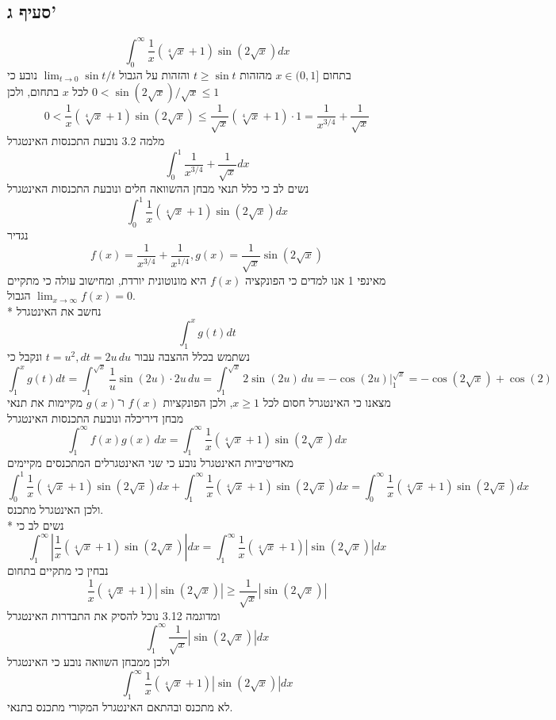 \subsection{סעיף ג'}
\[
	\int_0^\infty \frac{1}{x} (\sqrt[4]{x} + 1) \sin \left( 2 \sqrt{x} \right) dx
\]
בתחום $x \in (0, 1]$ מהזהות $t \ge \sin t$ והזהות על הגבול $\lim_{t \to 0} \sin t / t$ נובע כי $0 < \sin(2 \sqrt{x}) / \sqrt{x} \le 1$ לכל $x$ בתחום, %
ולכן
\[
	0 < 
	\frac{1}{x} (\sqrt[4]{x} + 1) \sin \left( 2 \sqrt{x} \right)
	\le \frac{1}{\sqrt{x}} (\sqrt[4]{x} + 1) \cdot 1
	= \frac{1}{x^{3/4}} + \frac{1}{\sqrt{x}}
\]
מלמה 3.2 נובעת התכנסות האינטגרל
\[
	\int_{0}^{1} \frac{1}{x^{3/4}} + \frac{1}{\sqrt{x}} dx
\]
נשים לב כי כלל תנאי מבחן ההשוואה חלים ונובעת התכנסות האינטגרל
\[
	\int_0^1 \frac{1}{x} (\sqrt[4]{x} + 1) \sin \left( 2 \sqrt{x} \right) dx
\]
נגדיר
\[
	f(x) = \frac{1}{x^{3/4}} + \frac{1}{x^{1/4}}, g(x) = \frac{1}{\sqrt{x}} \sin(2 \sqrt{x})
\]
מאינפי 1 אנו למדים כי הפונקציה $f(x)$ היא מונוטונית יורדת, ומחישוב עולה כי מתקיים הגבול $\lim_{x \to \infty} f(x) = 0$. \\*
נחשב את האינטגרל
\[
	\int_{1}^{x} g(t) dt
\]
נשתמש בכלל ההצבה עבור $t = u^2, dt = 2u \, du$ ונקבל כי
\[
	\int_{1}^{x} g(t) dt
	= \int_{1}^{\sqrt{x}} \frac{1}{u} \sin(2u) \cdot 2u \, du
	= \int_{1}^{\sqrt{x}} 2 \sin(2u) \, du
	= \left. -\cos(2u) \right|_1^{\sqrt{x}}
	= -\cos(2 \sqrt{x}) + \cos(2)
\]
מצאנו כי האינטגרל חסום לכל $x \ge 1$, ולכן הפונקציות $f(x)$ ו־$g(x)$ מקיימות את תנאי מבחן דיריכלה ונובעת התכנסות האינטגרל
\[
	\int_1^\infty f(x) g(x) \, dx
	= \int_1^\infty \frac{1}{x} (\sqrt[4]{x} + 1) \sin \left( 2 \sqrt{x} \right) dx
\]
מאדיטיביות האינטגרל נובע כי שני האינטגרלים המתכנסים מקיימים
\[
	\int_0^1 \frac{1}{x} (\sqrt[4]{x} + 1) \sin \left( 2 \sqrt{x} \right) dx
	+ \int_1^\infty \frac{1}{x} (\sqrt[4]{x} + 1) \sin \left( 2 \sqrt{x} \right) dx
	= \int_0^\infty \frac{1}{x} (\sqrt[4]{x} + 1) \sin \left( 2 \sqrt{x} \right) dx
\]
ולכן האינטגרל מתכנס. \\*
נשים לב כי
\[
	\int_1^\infty \left\lvert \frac{1}{x} (\sqrt[4]{x} + 1) \sin \left( 2 \sqrt{x} \right) \right\rvert dx
	= \int_1^\infty \frac{1}{x} (\sqrt[4]{x} + 1) \left\lvert \sin \left( 2 \sqrt{x} \right) \right\rvert dx
\]
נבחין כי מתקיים בתחום
\[
	\frac{1}{x} (\sqrt[4]{x} + 1) \left\lvert \sin \left( 2 \sqrt{x} \right) \right\rvert
	\ge \frac{1}{\sqrt{x}} \left\lvert \sin \left( 2 \sqrt{x} \right) \right\rvert
\]
ומדוגמה 3.12 נוכל להסיק את התבדרות האינטגרל
\[
	\int_{1}^{\infty} \frac{1}{\sqrt{x}} \left\lvert \sin \left( 2 \sqrt{x} \right) \right\rvert dx
\]
ולכן ממבחן השוואה נובע כי האינטגרל
\[
	\int_1^\infty \frac{1}{x} (\sqrt[4]{x} + 1) \left\lvert \sin \left( 2 \sqrt{x} \right) \right\rvert dx
\]
לא מתכנס ובהתאם האינטגרל המקורי מתכנס בתנאי.

